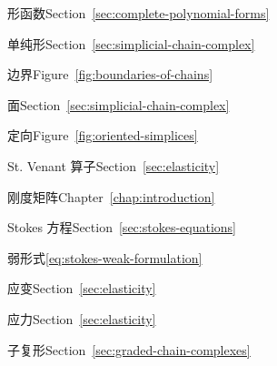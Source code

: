 \begin{theindex}
\item {}\label{index:shape-functions}{形函数}\quad Section~\ref{sec:complete-polynomial-forms}

\item {}\label{index:simplex}{单纯形}\quad Section~\ref{sec:simplicial-chain-complex}

\subitem {}\label{index:simplex-boundary-of}{边界}\quad Figure~\ref{fig:boundaries-of-chains}

\subitem {}\label{index:simplex-face}{面}\quad Section~\ref{sec:simplicial-chain-complex}

\subitem {}\label{index:simplex-orientation}{定向}\quad Figure~\ref{fig:oriented-simplices}

\item {}\label{index:st-venant-operator}{St. Venant 算子}\quad Section~\ref{sec:elasticity}

\item {}\label{index:stiffness-matrix}{刚度矩阵}\quad Chapter~\ref{chap:introduction}

\item {}\label{index:stokes-equations}{Stokes 方程}\quad Section~\ref{sec:stokes-equations}

\subitem {}\label{index:stokes-equations-weak-formulation}{弱形式}\quad \eqref{eq:stokes-weak-formulation}

\item {}\label{index:strain}{应变}\quad Section~\ref{sec:elasticity}

\item {}\label{index:stress}{应力}\quad Section~\ref{sec:elasticity}

\item {}\label{index:subcomplex}{子复形}\quad Section~\ref{sec:graded-chain-complexes}


\end{theindex}
